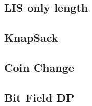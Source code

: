 \documentclass[10pt,landscape,a4paper,twocolumn]{article}
\begin{document}
\subsection{LIS only length}


\subsection{KnapSack}


\subsection{Coin Change}


\subsection{Bit Field DP}

\end{document}

